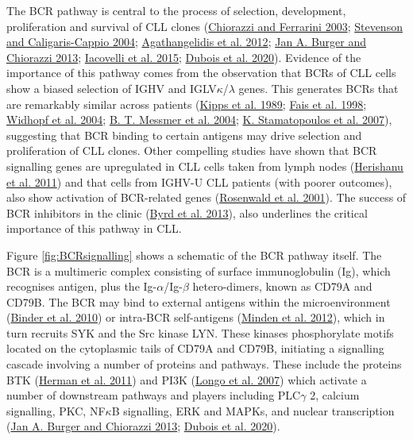 \documentclass[11pt, a4paper, twosided]{book}
\begin{document}
The BCR pathway is central to the process of selection, development, proliferation and survival of CLL clones (\protect\hyperlink{ref-Chiorazzi2003}{Chiorazzi and Ferrarini 2003}; \protect\hyperlink{ref-Stevenson2004}{Stevenson and Caligaris-Cappio 2004}; \protect\hyperlink{ref-Agathangelidis2012}{Agathangelidis et al. 2012}; \protect\hyperlink{ref-Burger2013}{Jan A. Burger and Chiorazzi 2013}; \protect\hyperlink{ref-Iacovelli2015}{Iacovelli et al. 2015}; \protect\hyperlink{ref-Dubois2020}{Dubois et al. 2020}). Evidence of the importance of this pathway comes from the observation that BCRs of CLL cells show a biased selection of IGHV and IGLV\(\kappa\)/\(\lambda\) genes. This generates BCRs that are remarkably similar across patients (\protect\hyperlink{ref-Kipps1989}{Kipps et al. 1989}; \protect\hyperlink{ref-Fais1998}{Fais et al. 1998}; \protect\hyperlink{ref-Widhopf2004}{Widhopf et al. 2004}; \protect\hyperlink{ref-Messmer2004}{B. T. Messmer et al. 2004}; \protect\hyperlink{ref-Stamatopoulos2007}{K. Stamatopoulos et al. 2007}), suggesting that BCR binding to certain antigens may drive selection and proliferation of CLL clones. Other compelling studies have shown that BCR signalling genes are upregulated in CLL cells taken from lymph nodes (\protect\hyperlink{ref-Herishanu2011}{Herishanu et al. 2011}) and that cells from IGHV-U CLL patients (with poorer outcomes), also show activation of BCR-related genes (\protect\hyperlink{ref-Rosenwald2001}{Rosenwald et al. 2001}). The success of BCR inhibitors in the clinic (\protect\hyperlink{ref-Byrd2013}{Byrd et al. 2013}), also underlines the critical importance of this pathway in CLL.

Figure \ref{fig:BCRsignalling} shows a schematic of the BCR pathway itself. The BCR is a multimeric complex consisting of surface immunoglobulin (Ig), which recognises antigen, plus the Ig-\(\alpha\)/Ig-\(\beta\) hetero-dimers, known as CD79A and CD79B. The BCR may bind to external antigens within the microenvironment (\protect\hyperlink{ref-Binder2010}{Binder et al. 2010}) or intra-BCR self-antigens (\protect\hyperlink{ref-Minden2012}{Minden et al. 2012}), which in turn recruits SYK and the Src kinase LYN. These kinases phosphorylate motifs located on the cytoplasmic tails of CD79A and CD79B, initiating a signalling cascade involving a number of proteins and pathways. These include the proteins BTK (\protect\hyperlink{ref-Herman2011}{Herman et al. 2011}) and PI3K (\protect\hyperlink{ref-Longo2007}{Longo et al. 2007}) which activate a number of downstream pathways and players including PLC\(\gamma\) 2, calcium signalling, PKC, NF\(\kappa\)B signalling, ERK and MAPKs, and nuclear transcription (\protect\hyperlink{ref-Burger2013}{Jan A. Burger and Chiorazzi 2013}; \protect\hyperlink{ref-Dubois2020}{Dubois et al. 2020}).
\end{document}
